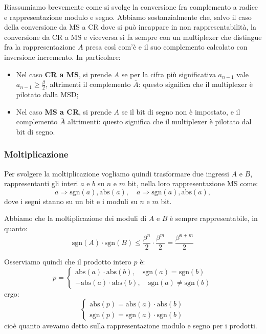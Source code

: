 \documentclass[a4paper,11pt]{article}
\begin{document}
Riassumiamo brevemente come si svolge la conversione fra complemento a radice e rappresentazione modulo e segno.
Abbiamo sostanzialmente che, salvo il caso della conversione da MS a CR dove si può incappare in non rappresentabilità, la conversione da CR a MS e viceversa si fa sempre con un multiplexer che distingue fra la rappresentazione $A$ presa così com'è e il suo complemento calcolato con inversione incremento. 
In particolare:
\begin{itemize}
	\item Nel caso \textbf{CR a MS}, si prende $A$ se per la cifra più significativa $a_{n-1}$ vale $a_{n-1} \geq \frac{\beta}{2}$, altrimenti il complemento $\overline{A}$: questo significa che il multiplexer è pilotato dalla MSD;
	\item Nel caso \textbf{MS a CR}, si prende $A$ se il bit di segno non è impostato, e il complemento $\overline{A}$ altrimenti: questo significa che il multiplexer è pilotato dal bit di segno.
\end{itemize}

\subsubsection{Moltiplicazione}
Per svolgere la moltiplicazione vogliamo quindi trasformare due ingressi $A$ e $B$, rappresentanti gli interi $a$ e $b$ su $n$ e $m$ bit, nella loro rappresentazione MS come:
$$
a \Rightarrow \mathrm{sgn}(a), \mathrm{abs}(a), \quad 
a \Rightarrow \mathrm{sgn}(a), \mathrm{abs}(a), 
$$
dove i segni stanno su un bit e i moduli su $n$ e $m$ bit.

Abbiamo che la moltiplicazione dei moduli di $A$ e $B$ è sempre rappresentabile, in quanto:
$$
\mathrm{sgn}(A) \cdot \mathrm{sgn}(B) \leq \frac{\beta^n}{2} \cdot \frac{\beta^m}{2} = \frac{\beta^{n+m}}{2}
$$

Osserviamo quindi che il prodotto intero $p$ è:
$$
p =
\begin{cases}
	\mathrm{abs}(a) \cdot \mathrm{abs}(b), \quad \mathrm{sgn}(a) = \mathrm{sgn}(b) \\ 
	-\mathrm{abs}(a) \cdot \mathrm{abs}(b), \quad \mathrm{sgn}(a) \neq \mathrm{sgn}(b)
\end{cases}
$$
ergo:
\[
	\begin{cases}
		\mathrm{abs}(p) = \mathrm{abs}(a) \cdot \mathrm{abs}(b) \\ 	
		\mathrm{sgn}(p) = \mathrm{sgn}(a) \cdot \mathrm{sgn}(b)
	\end{cases}
\]
cioè quanto avevamo detto sulla rappresentazione modulo e segno per i prodotti. 
\end{document}
